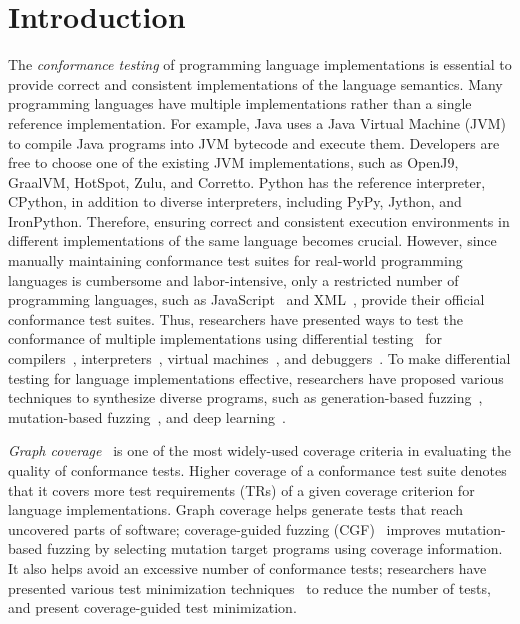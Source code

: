 \section{Introduction}\label{sec:intro}

The \textit{conformance testing} of programming language implementations is
essential to provide correct and consistent implementations of the
language semantics. Many programming languages have multiple implementations
rather than a single reference implementation. For example, Java uses a Java Virtual
Machine (JVM) to compile Java programs into JVM bytecode and execute them.
Developers are free to choose one of the existing JVM
implementations, such as OpenJ9, GraalVM, HotSpot, Zulu, and Corretto.
Python has the reference interpreter, CPython, in addition to diverse
interpreters, including PyPy, Jython, and IronPython.
Therefore, ensuring correct and consistent execution environments in different
implementations of the same language becomes crucial.
However, since manually maintaining conformance test suites for
real-world programming languages is cumbersome and labor-intensive, only a
restricted number of programming languages, such as JavaScript~\cite{test262}
and XML~\cite{xml-test-suite}, provide their official conformance test suites.
Thus, researchers have presented ways to test the
conformance of multiple implementations using differential
testing~\cite{diff-test} for compilers~\cite{csmith, deep-smith, diff-cpp-front,
diff-test-embedded}, interpreters~\cite{jit-picking, comfort}, virtual
machines~\cite{java-diff-test}, and debuggers~\cite{diff-debugger}.
To make differential testing for language implementations effective,
researchers have proposed various techniques to synthesize diverse programs,
such as generation-based fuzzing~\cite{csmith, jit-picking, diff-test-embedded, diff-debugger},
mutation-based fuzzing~\cite{java-diff-test, diff-cpp-front},
and deep learning~\cite{comfort, deep-smith}.


\textit{Graph coverage}~\cite{cov-def} is one of the most widely-used coverage criteria
in evaluating the quality of conformance tests.
Higher coverage of a conformance test suite denotes that it covers more
test requirements (TRs) of a given coverage criterion for language implementations.
Graph coverage helps generate tests that reach uncovered parts of software;
coverage-guided fuzzing (CGF)~\cite{afl} improves mutation-based fuzzing
by selecting mutation target programs using coverage information.
It also helps avoid an excessive number of conformance tests;
researchers have presented various test minimization techniques~\cite{test-minimize-survey}
to reduce the number of tests, and
\citet{cov-test-minimize} present coverage-guided test minimization.


